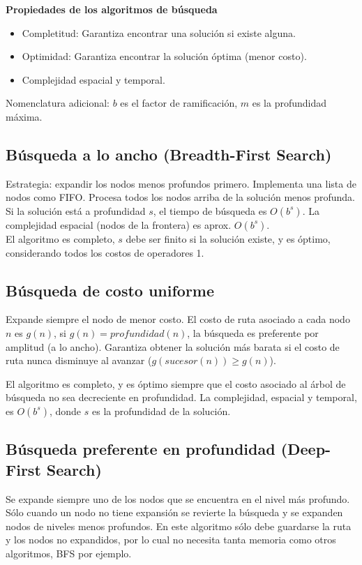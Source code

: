 \documentclass[a4paper,10pt]{paper}
\begin{document}
\textbf{Propiedades de los algoritmos de búsqueda}
\begin{itemize}
    \item Completitud: Garantiza encontrar una solución si existe alguna.
    \item Optimidad: Garantiza encontrar la solución óptima (menor costo).
    \item Complejidad espacial y temporal.
\end{itemize}
Nomenclatura adicional: $b$ es el factor de ramificación, $m$ es la profundidad
máxima.

\subsection{Búsqueda a lo ancho (Breadth-First Search)}
Estrategia: expandir los nodos menos profundos primero. Implementa una lista de
nodos como FIFO. Procesa todos los nodos arriba de la solución menos profunda.
Si la solución está a profundidad $s$, el tiempo de búsqueda es $O(b^s)$.
La complejidad espacial (nodos de la frontera) es aprox. $O(b^s)$.\\
El algoritmo es completo, $s$ debe ser finito si la solución existe, y es
óptimo, considerando todos los costos de operadores 1.

\subsection{Búsqueda de costo uniforme}
Expande siempre el nodo de menor costo. El costo de ruta asociado a cada nodo $n$
es $g(n)$, si $g(n) = profundidad(n)$, la búsqueda es preferente por amplitud (a lo
ancho). Garantiza obtener la solución más barata si el costo de ruta nunca disminuye
al avanzar ($g(sucesor(n)) \geq g(n)$).

El algoritmo es completo, y es óptimo siempre que el costo asociado al árbol de
búsqueda no sea decreciente en profundidad. La complejidad, espacial y temporal,
es $O(b^s)$, donde $s$ es la profundidad de la solución.

\subsection{Búsqueda preferente en profundidad (Deep-First Search)}
Se expande siempre uno de los nodos que se encuentra en el nivel más profundo.
Sólo cuando un nodo no tiene expansión se revierte la búsqueda y se expanden
nodos de niveles menos profundos. En este algoritmo sólo debe guardarse la ruta
y los nodos no expandidos, por lo cual no necesita tanta memoria como otros
algoritmos, BFS por ejemplo.
\end{document}
